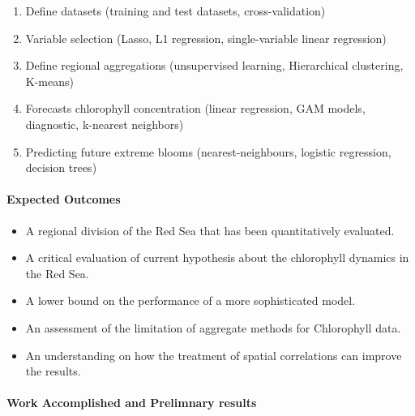 \begin{enumerate}
  \item Define datasets (training and test datasets, cross-validation)
  \item Variable selection (Lasso, L1 regression, single-variable linear regression)
  \item Define regional aggregations (unsupervised learning, Hierarchical clustering, K-means)
  \item Forecasts chlorophyll concentration (linear regression, GAM models, diagnostic, k-nearest neighbors)
  \item Predicting future extreme blooms (nearest-neighbours, logistic regression, decision trees)
\end{enumerate}

\paragraph{Expected Outcomes}

\begin{itemize}
  \item A regional division of the Red Sea that has been quantitatively evaluated.
  \item A critical evaluation of current hypothesis about the chlorophyll dynamics in the Red Sea.
  \item A lower bound on the performance of a more sophisticated model.
  \item An assessment of the limitation of aggregate methods for Chlorophyll data.
  \item An understanding on how the treatment of spatial correlations can improve the results.
\end{itemize}

\paragraph{Work Accomplished and Prelimnary results}
